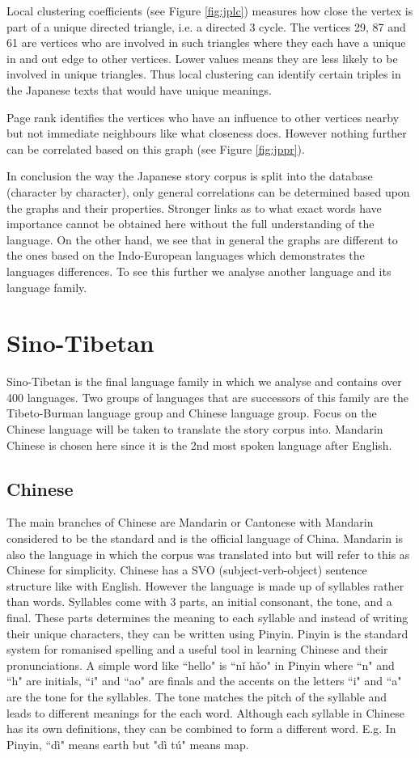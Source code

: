 Local clustering coefficients (see Figure \ref{fig:jplc}) measures how close the vertex is part of a unique directed triangle, i.e. a directed 3 cycle. The vertices 29, 87 and 61 are vertices who are involved in such triangles where they each have a unique in and out edge to other vertices. Lower values means they are less likely to be involved in unique triangles. Thus local clustering can identify certain triples in the Japanese texts that would have unique meanings. 

Page rank identifies the vertices who have an influence to other vertices nearby but not immediate neighbours like what closeness does. However nothing further can be correlated based on this graph (see Figure \ref{fig:jppr}).

In conclusion the way the Japanese story corpus is split into the database (character by character), only general correlations can be determined based upon the graphs and their properties. Stronger links as to what exact words have importance cannot be obtained here without the full understanding of the language. On the other hand, we see that in general the graphs are different to the ones based on the Indo-European languages which demonstrates the languages differences. To see this further we analyse another language and its language family.

\section{Sino-Tibetan}
Sino-Tibetan is the final language family in which we analyse and contains over 400 languages. Two groups of languages that are successors of this family are the Tibeto-Burman language group and Chinese language group. Focus on the Chinese language will be taken to translate the story corpus into. Mandarin Chinese is chosen here since it is the 2nd most spoken language after English.

\subsection{Chinese}
The main branches of Chinese are Mandarin or Cantonese with Mandarin considered to be the standard and is the official language of China. Mandarin is also the language in which the corpus was translated into but will refer to this as Chinese for simplicity. Chinese has a SVO (subject-verb-object) sentence structure like with English. However the language is made up of syllables \cite{ross2017modern} rather than words. Syllables come with 3 parts, an initial consonant, the tone, and a final. These parts determines the meaning to each syllable and instead of writing their unique characters, they can be written using Pinyin. Pinyin is the standard system for romanised spelling and a useful tool in learning Chinese and their pronunciations. A simple word like ``hello" is ``nǐ hǎo" in Pinyin where ``n" and ``h" are initials, ``i" and ``ao" are finals and the accents on the letters ``i" and ``a" are the tone for the syllables. The tone matches the pitch of the syllable and leads to different meanings for the each word. Although each syllable in Chinese has its own definitions, they can be combined to form a different word. E.g. In Pinyin, ``dì" means earth but "dì tú" means map.

